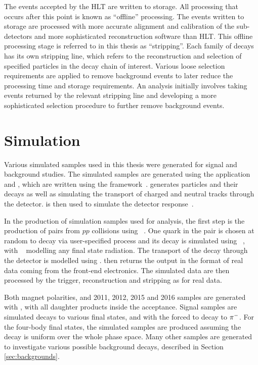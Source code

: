 The events accepted by the HLT are written to storage. All processing that occurs after this point is known as ``offline'' processing. The events written to storage are processed with more accurate alignment and calibration of the sub-detectors and more sophisticated reconstruction software than HLT. This offline processing stage is referred to in this thesis as ``stripping''. Each family of decays has its own stripping line, which refers to the reconstruction and selection of specified particles in the decay chain of interest. Various loose selection requirements are applied to remove background events to later reduce the processing time and storage requirements. An analysis initially involves taking events returned by the relevant stripping line and developing a more sophisticated selection procedure to further remove background events.

\section{Simulation}

Various simulated samples used in this thesis were generated for signal and background studies. The simulated samples are generated using the \lhcb application \gauss and \boole, which are written using the \gaudi framework~\cite{LHCb-PROC-2011-006,simulation}. \gauss generates particles and their decays as well as simulating the transport of charged and neutral tracks through the detector. \boole is then used to simulate the detector response~\cite{simulation}. 

In the production of simulation samples used for analysis, the first step is the production of \bquark\bquarkbar pairs from $pp$ collisions using ~\cite{Sjostrand:2007gs}. One quark in the \bquark\bquarkbar pair is chosen at random to decay via user-specified process and its decay is simulated using \evtgen~\cite{Lange:2001uf}, with \photos~\cite{Golonka:2005pn} modelling any final state radiation. The transport of the decay through the detector is modelled using \geant. \boole then returns the output in the format of real data coming from the front-end electronics. The simulated data are then processed by the trigger, reconstruction and stripping as for real data.

Both magnet polarities, and 2011, 2012, 2015 and 2016 samples are generated with , with all daughter products inside the \lhcb acceptance. Signal samples are simulated \btodkst decays to various \D final states, and with the \Kstarm forced to decay to \KS${{\pi}^-}$. For the four-body \D final states, the simulated samples are produced assuming the \D decay is uniform over the whole phase space. Many other samples are generated to investigate various possible background decays, described in Section \ref{sec:backgrounds}.
